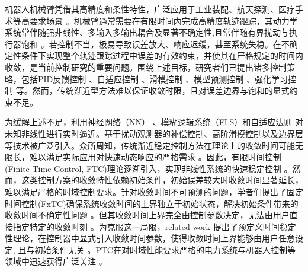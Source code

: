 \documentclass[pdflatex,sn-mathphys-num]{sn-jnl}%
\theoremstyle{thmstyleone}%
\theoremstyle{thmstyletwo}%
\theoremstyle{thmstylethree}%
\begin{document}
机器人机械臂凭借其高精度和柔性特性，广泛应用于工业装配、航天探测、医疗手术等高要求场景 \cite{SciaviccoSiciliano_2012_ModellingControl,BagheriEtAl_2019_Feedbacklinearization}。机械臂通常需要在有限时间内完成高精度轨迹跟踪，其动力学系统常伴随强非线性、多输入多输出耦合及显著不确定性,且常伴随有界扰动与执行器饱和 \cite{Spong_2022_historicalperspective, SciaviccoSiciliano_2012_ModellingControl}。若控制不当，极易导致误差放大、响应迟缓，甚至系统失稳。在不确定性条件下实现整个轨迹跟踪过程中误差的有效约束，并使其在严格规定的时间内收敛，是当前控制研究的重要问题。围绕上述目标，研究者们已提出诸多控制策略，包括PID反馈控制 \cite{ShojaeiEtAl_2021_ObserverBasedNeural,BagheriEtAl_2019_Feedbacklinearization}、自适应控制 \cite{ZhouEtAl_2022_Adaptivefinitetime,XuHe_2023_Robustadaptive,WangYang_2017_Dynamiclearning}、滑模控制 \cite{ZhangEtAl_2024_noveldisturbance,YangSu_2022_Proximatefixedtime, ZhaiLi_2022_Fastexponentialsliding}、模型预测控制 \cite{IncremonaEtAl_2017_MPCrobot}、强化学习控制 \cite{CaoEtAl_2023_ReinforcementLearningBased,WuEtAl_2024_TransferReinforcement} 等。然而，传统渐近型方法难以保证收敛时限，且对误差边界与饱和的显式约束不足。

为缓解上述不足，利用神经网络（NN）\cite{LiuEtAl_2018_Adaptiveneural} 、模糊逻辑系统（FLS）\cite{LiuEtAl_2025_Fuzzyadaptive}和自适应法则 \cite{WangEtAl_2022_Adaptiveactuator} 对未知非线性进行实时逼近。基于扰动观测器的补偿控制、高阶滑模控制以及边界层等技术被广泛引入。众所周知，传统渐近稳定控制方法在理论上的收敛时间可能无限长，难以满足实际应用对快速动态响应的严格需求 \cite{BacciottiRosier_2005_Liapunovfunctions}。因此，有限时间控制(Finite-Time Control, FTC)理论逐渐引入，实现非线性系统的快速稳定控制 \cite{SongLi_2024_Generallyapunov,LiuEtAl_2022_overviewfinite,SongEtAl_2023_Finitetimeadaptive}。然而，这类控制方案的收敛特性依赖初始条件，初始误差较大时收敛时间显著延长，难以满足严格的时域控制要求。针对收敛时间不可预测的问题，学者们提出了固定时间控制(FxTC)确保系统收敛时间的上界独立于初始状态，解决初始条件带来的收敛时间不确定性问题 \cite{Polyakov_2012_Nonlinearfeedback}。但其收敛时间上界完全由控制参数决定，无法由用户直接指定特定的收敛时刻 \cite{YangSu_2022_Proximatefixedtime,ZhangEtAl_2023_Globalcomposite}。为克服这一局限，related work 提出了预定义时间稳定性理论，在控制器中显式引入收敛时间参数，使得收敛时间上界能够由用户任意设定, 且与初始条件无关 \cite{GuoEtAl_2023_Predefinedtimestability,FanEtAl_2024_predefinedtime,WangEtAl_2022_Adaptivefuzzy}。PTC在对时域性能要求严格的电力系统与机器人控制等领域中迅速获得广泛关注 \cite{SunEtAl_2022_NeuralNetworkBased,WangEtAl_2022_Adaptivefuzzy,LiEtAl_2024_Adaptivepractical,ShenEtAl_2024_Predefinedtimeeventtriggered}。
\end{document}
